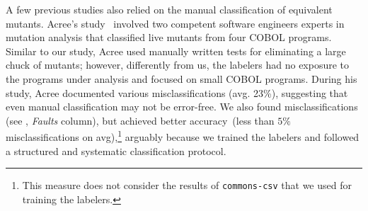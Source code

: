 \documentclass[sigconf,review,anonymous]{acmart}
\begin{document}
A few previous studies also relied on the manual classification of equivalent
mutants.
%
Acree's study~\cite{acree1980mutation} 
involved two competent software engineers experts in mutation analysis
that classified
live mutants from four COBOL programs.
Similar to our study, Acree used manually written tests
for eliminating a large chuck of mutants; however, differently 
from us, the labelers had no exposure to the programs under analysis and
focused on small COBOL programs.
%
During his study, Acree documented various misclassifications (avg. 23\%),
suggesting that even manual classification may not be error-free. 
%
We also found misclassifications (see , \emph{Faults} column),
but achieved better accuracy~(less than $5\%$ misclassifications on avg),\footnote{This measure does not consider the results of \texttt{commons-csv} that we used for training the labelers.}
arguably because we trained the labelers
and followed a structured and systematic classification protocol.
\end{document}
